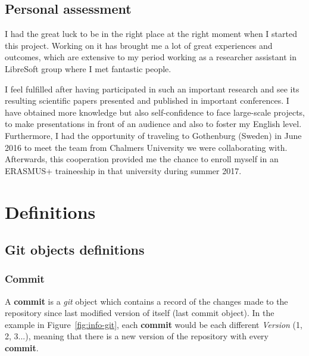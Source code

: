 \documentclass[a4paper, 12pt]{book}
\begin{document}
\section{Personal assessment}
\label{sec:assessment}
I had the great luck to be in the right place at the right moment when I started this project.
Working on it has brought me a lot of great experiences and outcomes, which are
extensive to my period working as a researcher assistant in LibreSoft group where I met fantastic people.\par
I feel fulfilled after having participated in such an important research and see its resulting scientific papers
presented and published in important conferences. I have obtained more knowledge but also self-confidence to face large-scale
projects, to make presentations in front of an audience and also to foster my English level. Furthermore,
I had the opportunity of traveling to Gothenburg (Sweden) in June 2016 to meet the team from Chalmers University
we were collaborating with. Afterwards, this cooperation provided me the chance to enroll myself in an
ERASMUS+ traineeship in that university during summer 2017.\par
\cleardoublepage
\appendix
\chapter{Definitions}
\label{app:definitions}
\section{Git objects definitions}
\label{sec:git-definitions}
\subsection{Commit}
\label{ssec:git-commit}
A \textbf{commit} is a \emph{git} object which contains a record of the changes made to the repository since last modified
version of itself (last commit object). In the example in Figure~\ref{fig:info-git}, each \textbf{commit} would be each different
\textit{Version} (1, 2, 3...), meaning that there is a new version of the repository with every \textbf{commit}.
\end{document}
